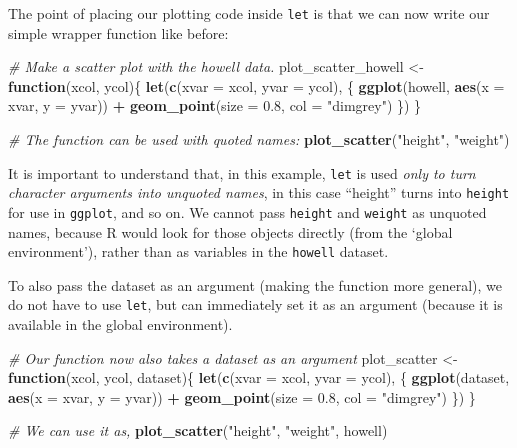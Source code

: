 \documentclass[]{book}
\newenvironment{Shaded}{\begin{snugshade}}{\end{snugshade}}
\newcommand{\CommentTok}[1]{\textcolor[rgb]{0.56,0.35,0.01}{\textit{#1}}}
\newcommand{\ControlFlowTok}[1]{\textcolor[rgb]{0.13,0.29,0.53}{\textbf{#1}}}
\newcommand{\DataTypeTok}[1]{\textcolor[rgb]{0.13,0.29,0.53}{#1}}
\newcommand{\FloatTok}[1]{\textcolor[rgb]{0.00,0.00,0.81}{#1}}
\newcommand{\KeywordTok}[1]{\textcolor[rgb]{0.13,0.29,0.53}{\textbf{#1}}}
\newcommand{\NormalTok}[1]{#1}
\newcommand{\OperatorTok}[1]{\textcolor[rgb]{0.81,0.36,0.00}{\textbf{#1}}}
\newcommand{\StringTok}[1]{\textcolor[rgb]{0.31,0.60,0.02}{#1}}
\begin{document}
The point of placing our plotting code inside \texttt{let} is that we can now write our simple wrapper function like before:

\begin{Shaded}
\begin{Highlighting}[]
\CommentTok{# Make a scatter plot with the howell data.}
\NormalTok{plot_scatter_howell <-}\StringTok{ }\ControlFlowTok{function}\NormalTok{(xcol, ycol)\{}
  \KeywordTok{let}\NormalTok{(}\KeywordTok{c}\NormalTok{(}\DataTypeTok{xvar =}\NormalTok{ xcol, }\DataTypeTok{yvar =}\NormalTok{ ycol), \{}
    \KeywordTok{ggplot}\NormalTok{(howell, }\KeywordTok{aes}\NormalTok{(}\DataTypeTok{x =}\NormalTok{ xvar, }\DataTypeTok{y =}\NormalTok{ yvar)) }\OperatorTok{+}
\StringTok{    }\KeywordTok{geom_point}\NormalTok{(}\DataTypeTok{size =} \FloatTok{0.8}\NormalTok{, }\DataTypeTok{col =} \StringTok{"dimgrey"}\NormalTok{)}
\NormalTok{  \})}
\NormalTok{\}}

\CommentTok{# The function can be used with quoted names:}
\KeywordTok{plot_scatter}\NormalTok{(}\StringTok{"height"}\NormalTok{, }\StringTok{"weight"}\NormalTok{)}
\end{Highlighting}
\end{Shaded}

It is important to understand that, in this example, \texttt{let} is used \emph{only to turn character arguments into unquoted names}, in this case ``height'' turns into \texttt{height} for use in \texttt{ggplot}, and so on. We cannot pass \texttt{height} and \texttt{weight} as unquoted names, because R would look for those objects directly (from the `global environment'), rather than as variables in the \texttt{howell} dataset.

To also pass the dataset as an argument (making the function more general), we do not have to use \texttt{let}, but can immediately set it as an argument (because it is available in the global environment).

\begin{Shaded}
\begin{Highlighting}[]
\CommentTok{# Our function now also takes a dataset as an argument}
\NormalTok{plot_scatter <-}\StringTok{ }\ControlFlowTok{function}\NormalTok{(xcol, ycol, dataset)\{}
  \KeywordTok{let}\NormalTok{(}\KeywordTok{c}\NormalTok{(}\DataTypeTok{xvar =}\NormalTok{ xcol, }\DataTypeTok{yvar =}\NormalTok{ ycol), \{}
    \KeywordTok{ggplot}\NormalTok{(dataset, }\KeywordTok{aes}\NormalTok{(}\DataTypeTok{x =}\NormalTok{ xvar, }\DataTypeTok{y =}\NormalTok{ yvar)) }\OperatorTok{+}
\StringTok{    }\KeywordTok{geom_point}\NormalTok{(}\DataTypeTok{size =} \FloatTok{0.8}\NormalTok{, }\DataTypeTok{col =} \StringTok{"dimgrey"}\NormalTok{)}
\NormalTok{  \})}
\NormalTok{\}}

\CommentTok{# We can use it as,}
\KeywordTok{plot_scatter}\NormalTok{(}\StringTok{"height"}\NormalTok{, }\StringTok{"weight"}\NormalTok{, howell)}
\end{Highlighting}
\end{Shaded}
\end{document}
